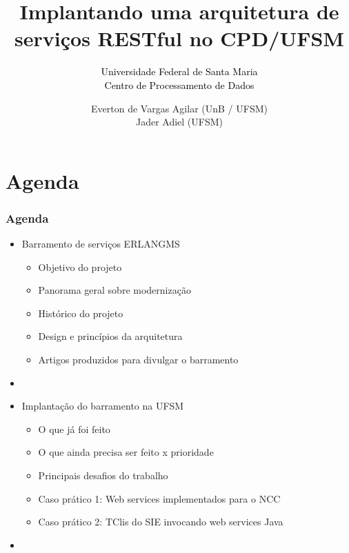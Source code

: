 \documentclass{beamer}
\title{Implantando uma arquitetura de serviços RESTful no CPD/UFSM}
\subtitle{ \textcolor{black}{Universidade Federal de Santa Maria} \\
			\textcolor{black}{\small{Centro de Processamento de Dados}} 
}
\author{Everton de Vargas Agilar (UnB / UFSM) \\
		Jader Adiel (UFSM)
}
\begin{document}
\begin{frame}
  \titlepage
\end{frame}





\section{Agenda}


\begin{frame}
  \frametitle{Agenda}

    \begin{itemize}

	    \item<1-> Barramento de serviços ERLANGMS
		    \begin{itemize}
		  	  \item<1->Objetivo do projeto
		  	  \item<1->Panorama geral sobre modernização
	    	  \item<1->Histórico do projeto
  	  	 	  \item<1->Design e princípios da arquitetura
  	  	 	  \item<1->Artigos produzidos para divulgar o barramento
		    \end{itemize}
	   	  \item<1-> 

	    \item<1-> Implantação do barramento na UFSM
		    \begin{itemize}
			\item<1->O que já foi feito
			\item<1->O que ainda precisa ser feito x prioridade
			\item<1->Principais desafios do trabalho
			\item<1->Caso prático 1: Web services implementados para o NCC
			\item<1->Caso prático 2: TClis do SIE invocando web services Java
		    \end{itemize}
   	    \item<1-> 
   	    


	 \end{itemize}	   	  

\end{frame}



\end{document}
